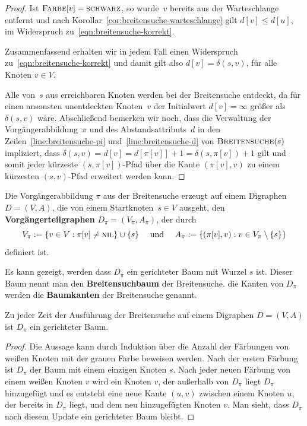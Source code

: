 \begin{proof}
Ist $\mathop{\text{\textsc{Farbe}}}[v]=\mathop{\text{\textsc{schwarz}}}$, so wurde~$v$ bereits aus der Warteschlange entfernt und nach Korollar~\ref{cor:breitensuche-warteschlange} gilt $d[v] \leq d[u]$, im Widerspruch zu~\eqref{eqn:breitensuche-korrekt}.

Zusammenfassend erhalten wir in jedem Fall einen Widerspruch zu~\eqref{eqn:breitensuche-korrekt} und damit gilt also $d[v]=\delta(s,v)$, für alle Knoten $v \in V$.

Alle von~$s$ aus erreichbaren Knoten werden bei der Breitensuche entdeckt, da für einen ansonsten unentdeckten Knoten~$v$ der Initialwert $d[v]=\infty$ größer als $\delta(s,v)$ wäre.
Abschließend bemerken wir noch, dass die Verwaltung der Vorgängerabbildung~$\pi$ und des Abstandsattributs~$d$ in den Zeilen~\ref{line:breitensuche-pi} und~\ref{line:breitensuche-d} von $\mathop{\text{\textsc{Breitensuche}}}(s)$ impliziert, dass $\delta(s,v)=d[v]=d[\pi[v]]+1=\delta(s,\pi[v])+1$ gilt und somit jeder kürzeste $(s,\pi[v])$-Pfad über die Kante $(\pi[v],v)$ zu einem kürzesten $(s,v)$-Pfad erweitert werden kann.
\end{proof}

\begin{defn} 
	Die Vorgängerabbildung $\pi$ aus der Breitensuche erzeugt auf einem Digraphen $D=(V,A)$, die von einem Startknoten~$s \in V$ ausgeht, den \textbf{Vorgängerteilgraphen} $D_\pi = (V_\pi,A_\pi)$, der durch
	\[
	V_\pi := \left\{ v \in V : \pi[v] \neq \mathop{\text{\textsc{nil}}}\right\} \cup \{s\} \quad \text{ und } \quad A_\pi := \left\{ (\pi[v],v) : v \in V_\pi \setminus \{s\}\right\}
	\]
	definiert ist.
	
	Es kann gezeigt, werden dass $D_\pi$ ein gerichteter Baum mit Wurzel $s$ ist. Dieser Baum nennt man den \textbf{Breitensuchbaum} der Breitensuche. die  Kanten von $D_\pi$ werden die \textbf{Baumkanten} der Breitensuche genannt.
\end{defn}

\begin{prop}
	Zu jeder Zeit der Ausführung der Breitensuche auf einem Digraphen $D=(V,A)$ ist $D_\pi$ ein gerichteter Baum. 
\end{prop} 
\begin{proof} 
	Die Aussage kann durch Induktion über die Anzahl der Färbungen von weißen Knoten mit der grauen Farbe beweisen werden. 
	Nach der ersten Färbung ist $D_\pi$ der Baum mit einem einzigen Knoten $s$. Nach jeder neuen Färbung von einem weißen Knoten $v$ wird ein Knoten $v$, der außerhalb von $D_\pi $ liegt $D_\pi$ hinzugefügt und es entsteht eine neue Kante $(u,v)$ zwischen einem Knoten $u$, der bereits in $D_\pi$ liegt, und dem neu hinzugefügten Knoten $v$. Man sieht, dass $D_\pi$ nach diesem Update ein gerichteter Baum bleibt. 
\end{proof} 

